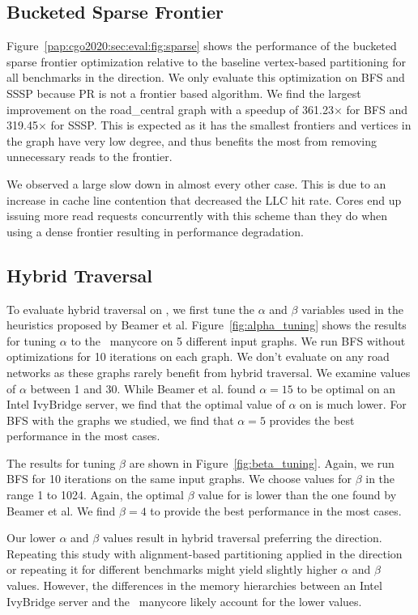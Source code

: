 \subsection{Bucketed Sparse Frontier}

Figure~\ref{pap:cgo2020:sec:eval:fig:sparse} shows the performance of the bucketed sparse frontier optimization relative to the baseline vertex-based partitioning for all benchmarks in the \push direction.
We only evaluate this optimization on BFS and SSSP because PR is not a frontier based algorithm.
We find the largest improvement on the road\_central graph with a speedup of 361.23$\times$ for BFS and 319.45$\times$ for SSSP.
This is expected as it has the smallest frontiers and vertices in the graph have very low degree, and thus benefits the most from removing unnecessary reads to the frontier.

We observed a large slow down in almost every other case.
This is due to an increase in cache line contention that decreased the LLC hit rate. 
Cores end up issuing more read requests concurrently with this scheme than they do when using a dense frontier resulting in performance degradation.

\subsection{Hybrid Traversal}
\alphatune
\betatune
To evaluate hybrid traversal on \hb, we first tune the $\alpha$ and $\beta$ variables used in the heuristics proposed by Beamer et al.
Figure~\ref{fig:alpha_tuning} shows the results for tuning $\alpha$ to the \hb~manycore on 5 different input graphs. 
We run BFS without optimizations for 10 iterations on each graph.
We don't evaluate on any road networks as these graphs rarely benefit from hybrid traversal.
We examine values of $\alpha$ between 1 and 30.
While Beamer et al. found $\alpha=15$ to be optimal on an Intel IvyBridge server, we find that the optimal value of $\alpha$ on \hb is much lower.
For BFS with the graphs we studied, we find that $\alpha=5$ provides the best performance in the most cases.

The results for tuning $\beta$ are shown in Figure~\ref{fig:beta_tuning}.
Again, we run BFS for 10 iterations on the same input graphs.
We choose values for $\beta$ in the range 1 to 1024.
Again, the optimal $\beta$ value for \hb is lower than the one found by Beamer et al.
We find $\beta=4$ to provide the best performance in the most cases.

Our lower $\alpha$ and $\beta$ values result in hybrid traversal preferring the \push direction.
Repeating this study with alignment-based partitioning applied in the \pull direction or repeating it for different benchmarks might yield slightly higher $\alpha$ and $\beta$ values.
However, the differences in the memory hierarchies between an Intel IvyBridge server and the \hb~manycore likely account for the lower values.

